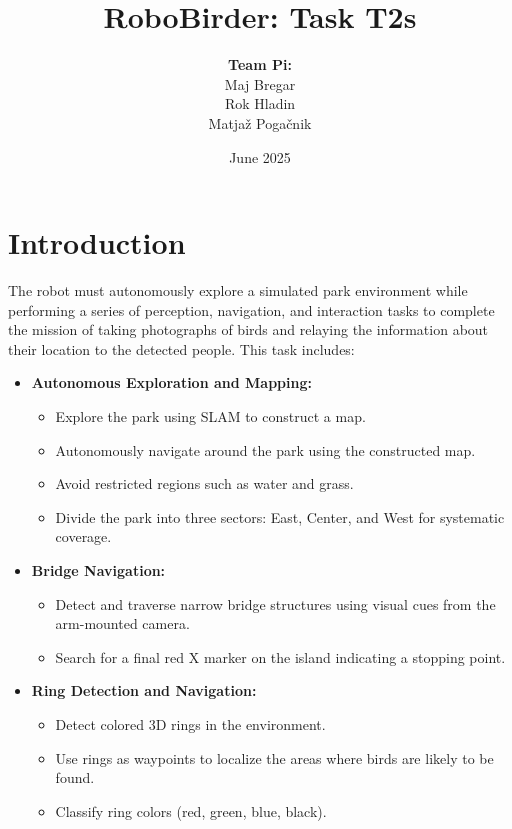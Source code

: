 \documentclass[a4paper]{article}
\title{RoboBirder: Task T2s}
\author{
\textbf{Team Pi:}\\
Maj Bregar\\
Rok Hladin\\
Matjaž Pogačnik
}
\date{June 2025}
\begin{document}
\maketitle

\newpage
\tableofcontents
\listoffigures
\newpage

\section{Introduction}

The robot must autonomously explore a simulated park environment while performing a series of perception, navigation, and interaction tasks to complete the mission of taking photographs of birds and relaying the information about their location to the detected people. This task includes: 

\begin{itemize}

    \item \textbf{Autonomous Exploration and Mapping:}
    \begin{itemize}
        \item Explore the park using SLAM to construct a map.
        \item Autonomously navigate around the park using the constructed map.
        \item Avoid restricted regions such as water and grass.
        \item Divide the park into three sectors: East, Center, and West for systematic coverage.
    \end{itemize}

    \item \textbf{Bridge Navigation:}
    \begin{itemize}
        \item Detect and traverse narrow bridge structures using visual cues from the arm-mounted camera.
        \item Search for a final red X marker on the island indicating a stopping point.
    \end{itemize}

    \item \textbf{Ring Detection and Navigation:}
    \begin{itemize}
        \item Detect colored 3D rings in the environment.
        \item Use rings as waypoints to localize the areas where birds are likely to be found.
        \item Classify ring colors (red, green, blue, black).
    \end{itemize}


\end{itemize}
\end{document}
